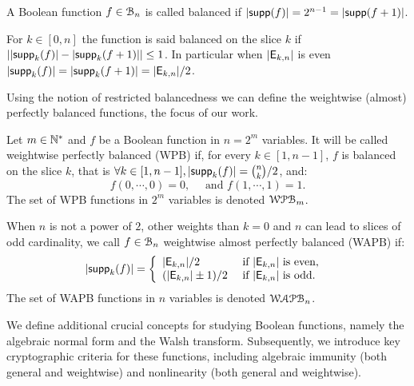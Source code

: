 \documentclass[11pt]{llncs}
\begin{document}
\begin{definition}[Balancedness]\label{def:balancedness}
	A Boolean function $f\in \mathcal{B}_n$ is called balanced if $|\mathsf{supp}(f)|=2^{n-1}=|\mathsf{supp}(f+1)|$. 
	
	For $k\in [0,n]$ the function is said balanced on the slice $k$ if $||\mathsf{supp}_{k}(f)|-|\mathsf{supp}_{k}(f+1)| |\le 1$. In particular when $|\mathsf{E}_{k,n}|$ is even $|\mathsf{supp}_{k}(f)|=|\mathsf{supp}_{k}(f+1)|=|\mathsf{E}_{k,n}|/2$.
\end{definition}


Using the notion of restricted balancedness we can define the weightwise (almost) perfectly balanced functions, the focus of our work.

\begin{definition}\label{def:WAPB}
	Let $m\in \mathbb{N}^*$ and $f$ be a Boolean function in $n=2^m$ variables. It will be called weightwise perfectly balanced (WPB) if, for every $k\in[1,n-1]$, $f$ is balanced on the slice $k$, that is $\forall k \in [1,n-1], |\mathsf{supp}_{k}(f)|=\binom{n}{k}/2$, and:
	\[f(0,\cdots,0)=0,\quad \text{ and } f(1,\cdots,1)=1.\]	
	The set of WPB functions in $2^m$ variables is denoted $\mathcal{WPB}_{m}$.
	
	When $n$ is not a power of $2$, other weights than $k=0$ and $n$ can lead to slices of odd cardinality, we call $f\in \mathcal{B}_{n}$ weightwise almost perfectly balanced (WAPB) if: 
	\[|\mathsf{supp}_{k}(f)|= \left \{
	\begin{array}{l l}
	|\mathsf{E}_{k,n}|/2  & \text{ if } |\mathsf{E}_{k,n}| \text{ is even, } \\
	(|\mathsf{E}_{k,n}|\pm 1)/2  & \text{ if }  |\mathsf{E}_{k,n}| \text{ is odd.}
	\end{array}\right.\]
	The set of WAPB functions in $n$ variables is denoted $\mathcal{WAPB}_{n}$.		
\end{definition}



We define additional crucial concepts for studying Boolean functions, namely the algebraic normal form and the Walsh transform. 
Subsequently, we introduce key cryptographic criteria for these functions, including algebraic immunity (both general and weightwise) and nonlinearity (both general and weightwise).
\end{document}
